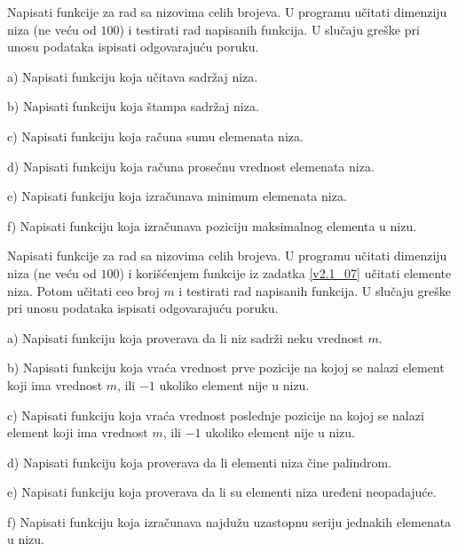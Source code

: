 \begin{Exercise}[label=v2.1_07] 
Napisati funkcije za rad sa nizovima celih brojeva. U programu učitati
dimenziju niza (ne veću od $100$) i testirati rad napisanih
funkcija. U slučaju greške pri unosu podataka ispisati odgovarajuću
poruku.
\begin{description}
\item{a)} Napisati funkciju  koja učitava sadržaj niza. %
\item{b)} Napisati funkciju  koja štampa sadržaj niza.
\item{c)} Napisati funkciju koja računa sumu elemenata niza.   
\item{d)} Napisati funkciju koja računa prosečnu vrednost elemenata niza.
\item{e)} Napisati funkciju koja izračunava minimum elemenata niza.
\item{f)} Napisati funkciju koja izračunava poziciju maksimalnog elementa u nizu.
\end{description}
\end{Exercise}
\begin{Answer}[ref=v2.1_07]
\end{Answer}

\begin{Exercise}[label=v2.1_08] 
Napisati funkcije za rad sa nizovima celih brojeva. U programu učitati
dimenziju niza (ne veću od $100$) i korišćenjem funkcije
 iz zadatka \ref{v2.1_07} učitati elemente niza. Potom
učitati ceo broj $m$ i testirati rad napisanih funkcija. U slučaju
greške pri unosu podataka ispisati odgovarajuću poruku.
\begin{description}
\item{a)} Napisati funkciju koja proverava da li niz sadrži neku vrednost $m$.
\item{b)} Napisati funkciju koja vraća vrednost prve pozicije na kojoj se 
nalazi element koji ima vrednost $m$, ili $-1$ ukoliko element nije u nizu.
\item{c)} Napisati funkciju koja vraća vrednost poslednje pozicije na kojoj se 
nalazi element koji ima vrednost $m$, ili $-1$ ukoliko element nije u nizu.
\item{d)} Napisati funkciju koja proverava da li elementi niza čine palindrom.
\item{e)} Napisati funkciju koja proverava da li su elementi niza uređeni 
neopadajuće.
\item{f)} Napisati funkciju koja izračunava najdužu uzastopnu seriju jednakih 
elemenata u nizu.
\end{description}
\end{Exercise}
\begin{Answer}[ref=v2.1_08]
\end{Answer}

